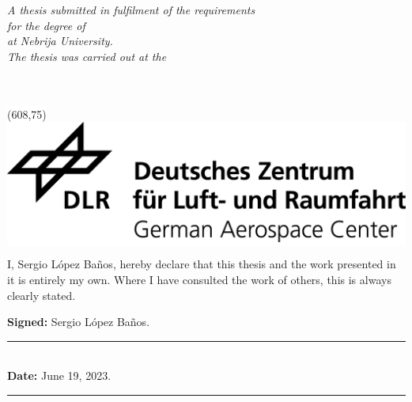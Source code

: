 \documentclass[
11pt, %
english, %
singlespacing, %
headsepline, %
]{MastersDoctoralThesis} %
\begin{document}
\begin{titlepage}
\begin{center}
\vfill

\large \textit{A thesis submitted in fulfilment of the requirements \\ for the degree of \degreename \\ at Nebrija University.}\\[0.3cm] %
\textit{The thesis was carried out at the}\\[0.4cm]
\groupname\\\deptname\\[1cm] %
\vfill
\centerline{{\colorbox{white}{\makebox(608,75){\includegraphics[scale=0.65]{logos/DLR_Logo_EN_schwarz.png}}}}}

\vfill
\end{center}
\end{titlepage}
\pagecolor{white}

\begin{declaration}
\addchaptertocentry{\authorshipname} %
\noindent I, Sergio López Baños, hereby declare that this thesis and the work presented in it is entirely my own. Where I have consulted the work of others, this is always clearly stated.
\vspace{5mm}
 \begin{center}
   \noindent \textbf{Signed:} \color{blue}Sergio López Baños\color{black}.\\
\rule[0.5em]{25em}{0.5pt}\\ %
\noindent \textbf{Date:} \color{blue} June 19, 2023\color{black}.\\
\rule[0.5em]{25em}{0.5pt} %
 \end{center}
\end{declaration}
\end{document}
